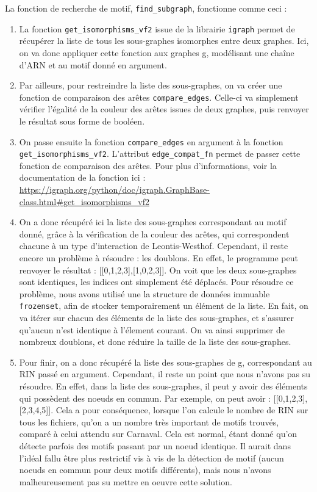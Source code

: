 \documentclass[11pt,a4paper]{article}
\begin{document}
La fonction de recherche de motif, \texttt{find\_subgraph}, fonctionne comme ceci : \\
\begin{enumerate}
\item La fonction \texttt{get\_isomorphisms\_vf2} issue de la librairie \texttt{igraph} permet de récupérer la liste de tous les sous-graphes isomorphes entre deux graphes. Ici, on va donc appliquer cette fonction aux graphes g, modélisant une chaîne d'ARN et au motif donné en argument. \\
\item Par ailleurs, pour restreindre la liste des sous-graphes, on va créer une fonction de comparaison des arêtes \texttt{compare\_edges}. Celle-ci va simplement vérifier l'égalité de la couleur des arêtes issues de deux graphes, puis renvoyer le résultat sous forme de booléen.  \\
\item On passe ensuite la fonction \texttt{compare\_edges} en argument à la fonction \texttt{get\_isomorphisms\_vf2}. L'attribut \texttt{edge\_compat\_fn} permet de passer cette fonction de comparaison des arêtes. Pour plus d'informations, voir la documentation de la fonction ici : 
\url{https://igraph.org/python/doc/igraph.GraphBase-class.html#get_isomorphisms_vf2} \\
\item On a donc récupéré ici la liste des sous-graphes correspondant au motif donné, grâce à la vérification de la couleur des arêtes, qui correspondent chacune à un type d'interaction de Leontis-Westhof.
Cependant, il reste encore un problème à résoudre : les doublons. En effet, le programme peut renvoyer le résultat : [[0,1,2,3],[1,0,2,3]].
On voit que les deux sous-graphes sont identiques, les indices ont simplement été déplacés. Pour résoudre ce problème, nous avons utilisé une la structure de données immuable \texttt{frozenset}, afin de stocker temporairement un élément de la liste. En fait, on va itérer sur chacun des éléments de la liste des sous-graphes, et s'assurer qu'aucun n'est identique à l'élement courant. On va ainsi supprimer de nombreux doublons, et donc réduire la taille de la liste des sous-graphes. \\
\item Pour finir, on a donc récupéré la liste des sous-graphes de g, correspondant au RIN passé en argument. Cependant, il reste un point que nous n'avons pas su résoudre. En effet, dans la liste des sous-graphes, il peut y avoir des éléments qui possèdent des noeuds en commun. Par exemple, on peut avoir : [[0,1,2,3],[2,3,4,5]]. Cela a pour conséquence, lorsque l'on calcule le nombre de RIN sur tous les fichiers, qu'on a un nombre très important de motifs trouvés, comparé à celui attendu sur Carnaval. Cela est normal, étant donné qu'on détecte parfois des motifs passant par un noeud identique. Il aurait dans l'idéal fallu être plus restrictif vis à vis de la détection de motif (aucun noeuds en commun pour deux motifs différents), mais nous n'avons malheureusement pas su mettre en oeuvre cette solution.

\end{enumerate}
\end{document}
